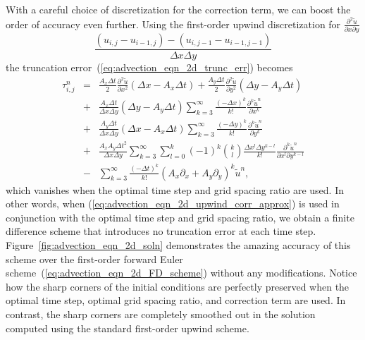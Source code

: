 \documentclass[fleqn,12pt,twoside]{article}
\newcommand{\beq}{\begin{equation}}
\newcommand{\eeq}{\end{equation}}
\newcommand{\bea}{\begin{eqnarray}}
\newcommand{\eea}{\end{eqnarray}}
\def\px{\partial x}
\def\py{\partial y}
\def\tu{\tilde{u}}
\def\dt{\Delta t}
\def\dx{\Delta x}
\def\dy{\Delta y}
\begin{document}
With a careful choice of discretization for the correction term, we can
boost the order of accuracy even further.  Using the first-order upwind 
discretization for $\frac{\partial^2 \tu}{\px \py}$
\beq
   \frac{ \left(u_{i,j} - u_{i-1,j}\right) 
        - \left(u_{i,j-1} - u_{i-1,j-1}\right)}
        {\dx \dy} 
  \label{eq:advection_eqn_2d_upwind_corr_approx}
\eeq
the truncation error~(\ref{eq:advection_eqn_2d_trunc_err}) becomes
\bea
  \tau^{n}_{i,j} &=&
      \frac{A_x \dt}{2} \frac{\partial^2 \tu}{\px^2}
      \left( \dx - A_x \dt \right)
    + \frac{A_y \dt}{2} \frac{\partial^2 \tu}{\py^2}
      \left( \dy - A_y \dt \right)
   \nonumber \\
   &+& \frac{A_x\dt}{\dx \dy} ( \dy - A_y \dt )
       \sum_{k=3}^\infty \frac{\left( -\dx \right)^k}{k!} 
              \frac{\partial^k \tu^n}{\px^k} 
   \nonumber \\
   &+& \frac{A_y\dt}{\dx \dy} ( \dx - A_x \dt )
       \sum_{k=3}^\infty \frac{\left( -\dy \right)^k}{k!} 
              \frac{\partial^k \tu^n}{\py^k} 
   \nonumber \\
   &+& \frac{A_x A_y\dt^2}{\dx \dy} 
       \sum_{k=3}^\infty \sum_{l=0}^{k}
              (-1)^k {k \choose l}
              \frac{\dx^l \dy^{k-l}}{k!} 
              \frac{\partial^k \tu^n}{\px^l \py^{k-l}} 
   \nonumber \\
   &-& \sum_{k=3}^\infty \frac{\left( -\dt \right)^k}{k!} 
       \left( A_x \partial_x + A_y \partial_y
              \right)^k \tu^{n} 
  \label{eq:advection_eqn_2d_trunc_err_mod},
\eea
which vanishes when the optimal time step and grid spacing ratio are used.
In other words, when (\ref{eq:advection_eqn_2d_upwind_corr_approx}) is used 
in conjunction with the optimal time step and grid spacing ratio, we obtain
a finite difference scheme that introduces no truncation error at each time 
step.  Figure~\ref{fig:advection_eqn_2d_soln} demonstrates the amazing accuracy 
of this scheme over the first-order forward Euler 
scheme~(\ref{eq:advection_eqn_2d_FD_scheme}) without any modifications.
Notice how the sharp corners of the initial conditions are perfectly 
preserved when the optimal time step, optimal grid spacing ratio, and 
correction term are used.  In contrast, the sharp corners are
completely smoothed out in the solution computed using the standard 
first-order upwind scheme. 
\end{document}
